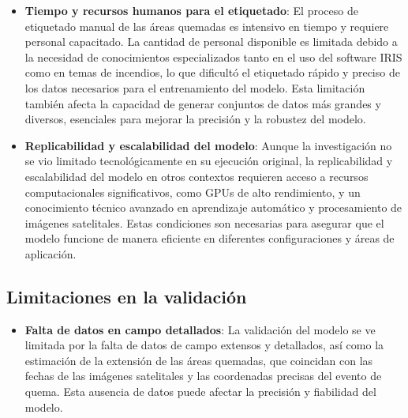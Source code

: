 \begin{itemize}
    \item \textbf{Tiempo y recursos humanos para el etiquetado}: El proceso de etiquetado manual de las áreas quemadas es intensivo en tiempo y requiere personal capacitado. 
    La cantidad de personal disponible es limitada debido a la necesidad de conocimientos especializados tanto en el uso del software IRIS como en temas de incendios, lo que dificultó 
    el etiquetado rápido y preciso de los datos necesarios para el entrenamiento del modelo. Esta limitación también afecta la capacidad de generar conjuntos de datos más grandes y diversos, 
    esenciales para mejorar la precisión y la robustez del modelo.

    \item \textbf{Replicabilidad y escalabilidad del modelo}: Aunque la investigación no se vio limitado tecnológicamente en su ejecución original, la replicabilidad y escalabilidad del modelo en otros 
    contextos requieren acceso a recursos computacionales significativos, como GPUs de alto rendimiento, y un conocimiento técnico avanzado en aprendizaje automático y procesamiento de imágenes 
    satelitales. Estas condiciones son necesarias para asegurar que el modelo funcione de manera eficiente en diferentes configuraciones y áreas de aplicación.
\end{itemize}

\subsection{Limitaciones en la validación}

\begin{itemize}
    \item \textbf{Falta de datos en campo detallados}:  La validación del modelo se ve limitada por la falta de datos de campo extensos y detallados, así como la estimación de la extensión de las áreas quemadas, 
    que coincidan con las fechas de las imágenes satelitales y las coordenadas precisas del evento de quema. Esta ausencia de datos puede afectar la precisión y fiabilidad del modelo.   
\end{itemize}
